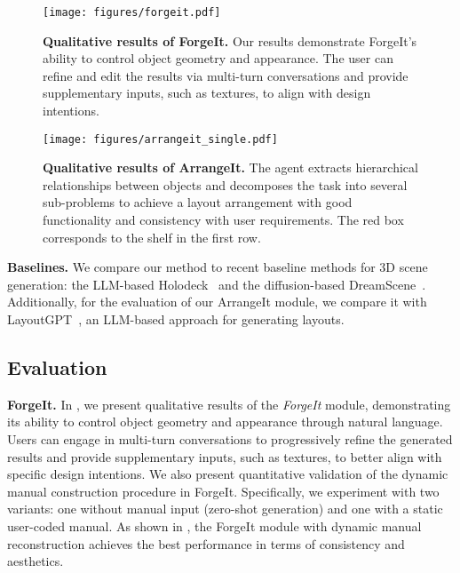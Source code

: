 \begin{figure*}[t]
\begin{center}
    \texttt{[image: figures/forgeit.pdf]}
\end{center}
\caption{\textbf{Qualitative results of ForgeIt.}
Our results demonstrate ForgeIt's ability to control object geometry and appearance. The user can refine and edit the results via multi-turn conversations and provide supplementary inputs, such as textures, to align with design intentions.
}
\label{fig:forgeit_result1}
\end{figure*}


\begin{figure*}[t]
\begin{center}
    \texttt{[image: figures/arrangeit\_single.pdf]}
\end{center}
\caption{\textbf{Qualitative results of ArrangeIt.} The agent extracts hierarchical relationships between objects and decomposes the task into several sub-problems to achieve a layout arrangement with good functionality and consistency with user requirements. The red box corresponds to the shelf in the first row.
}
\label{fig:arrangeit_result}
\end{figure*}







\noindent\textbf{Baselines.}
We compare our method to recent baseline methods for 3D scene generation: the LLM-based Holodeck~\cite{yang2024holodeck} and the diffusion-based DreamScene~\cite{li2025dreamscene}. Additionally, for the evaluation of our ArrangeIt module, we compare it with LayoutGPT~\cite{feng2024layoutgpt}, an LLM-based approach for generating layouts.













\subsection{Evaluation}
\noindent \textbf{ForgeIt.} In , we present qualitative results of the \textit{ForgeIt} module, demonstrating its ability to control object geometry and appearance through natural language. Users can engage in multi-turn conversations to progressively refine the generated results and provide supplementary inputs, such as textures, to better align with specific design intentions.
%
We also present quantitative validation of the dynamic manual construction procedure in ForgeIt. Specifically, we experiment with two variants: one without manual input (zero-shot generation) and one with a static user-coded manual. As shown in , the ForgeIt module with dynamic manual reconstruction achieves the best performance in terms of consistency and aesthetics.

